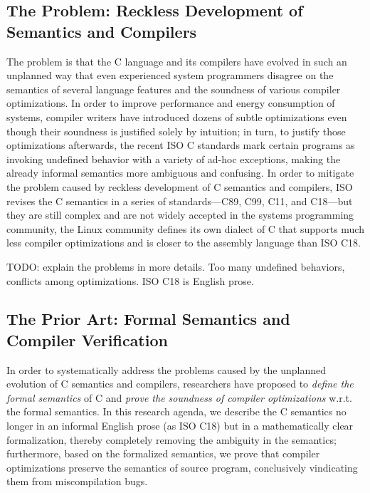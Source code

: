 \subsection{The Problem: Reckless Development of Semantics and Compilers}

The problem is that the C language and its compilers have evolved in such an unplanned way that even
experienced system programmers disagree on the semantics of several language features and the
soundness of various compiler optimizations.  In order to improve performance and energy consumption
of systems, compiler writers have introduced dozens of subtle optimizations even though their
soundness is justified solely by intuition; in turn, to justify those optimizations afterwards, the
recent ISO C standards mark certain programs as invoking undefined behavior with a variety of ad-hoc
exceptions, making the already informal semantics more ambiguous and confusing.  In order to
mitigate the problem caused by reckless development of C semantics and compilers, ISO revises the C
semantics in a series of standards---C89, C99, C11, and C18---but they are still complex and are not
widely accepted in the systems programming community, \eg{} the Linux community defines its own
dialect of C that supports much less compiler optimizations and is closer to the assembly language
than ISO C18.

TODO: explain the problems in more details.  Too many undefined behaviors, conflicts among
optimizations.  ISO C18 is English prose.


\subsection{The Prior Art: Formal Semantics and Compiler Verification}

In order to systematically address the problems caused by the unplanned evolution of C semantics and
compilers, researchers have proposed to \emph{define the formal semantics} of C and \emph{prove the
  soundness of compiler optimizations} w.r.t. the formal semantics.  In this research agenda, we
describe the C semantics no longer in an informal English prose (as ISO C18) but in a mathematically
clear formalization, thereby completely removing the ambiguity in the semantics; furthermore, based
on the formalized semantics, we prove that compiler optimizations preserve the semantics of source
program, conclusively vindicating them from miscompilation bugs.

